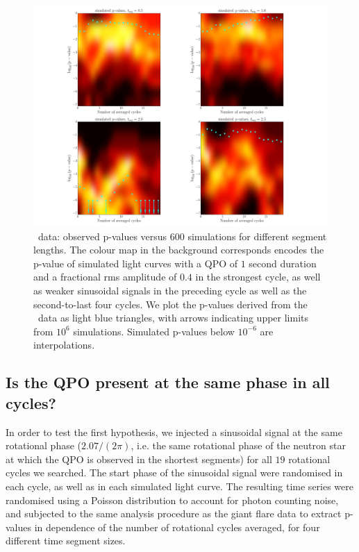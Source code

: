 \documentclass{emulateapj}
\begin{document}
 \begin{figure}[htbp]
\begin{center}
\includegraphics[width=\textwidth]{f9.pdf}
\caption{\rhessi\ data: observed p-values versus $600$ simulations for different segment lengths. The colour map in the background corresponds encodes the p-value of simulated light curves with a QPO of $1$ second duration and a fractional rms amplitude of $0.4$ in the strongest cycle, as well as weaker sinusoidal signals in the preceding cycle as well as the second-to-last four cycles. We plot the p-values derived from the \rhessi\ data as light blue triangles, with arrows indicating upper limits from $10^{6}$ simulations. Simulated p-values below $10^{-6}$ are interpolations.}
\label{fig:rhessi_sims3_pvalues}
\end{center}
\end{figure}

\subsection{Is the QPO present at the same phase in all cycles?}

In order to test the first hypothesis, we injected a sinusoidal signal at the same rotational phase ($2.07/(2\pi)$, i.e. the same rotational phase of the neutron star at which the QPO is observed in the shortest segments) for all $19$ rotational cycles we searched. The start phase of the sinusoidal signal were randomised in each cycle, as well as in each simulated light curve. The resulting time series were randomised using a Poisson distribution to account for photon counting noise, and subjected to the same analysis procedure as the giant flare data to extract p-values in dependence of the number of rotational cycles averaged, for four different time segment sizes.
\end{document}
